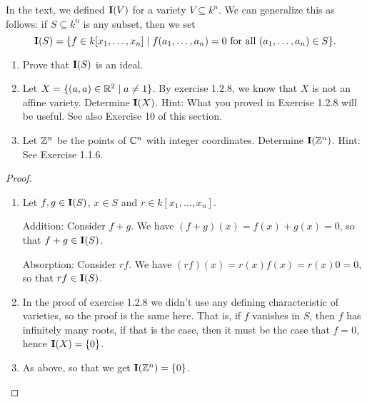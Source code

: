 \begin{exercise}{15}
In the text, we defined $\mathbf{I}(V)$ for a variety $V\subseteq k^n$. We can generalize this as follows: if $S\subseteq k^n$ is any subset, then we set
\[
\mathbf{I}(S)=\{f\in k[x_1,\dots,x_n]\mid f(a_1,\dots,a_n)=0\text{ for all }(a_1,\dots,a_n)\in S\}.
\]
\begin{enumerate}
    \item Prove that $\mathbf{I}(S)$ is an ideal.
    \item Let $X=\{(a,a)\in\mathbb{R}^2\mid a\neq 1\}$. By exercise 1.2.8, we know that $X$ is not an affine variety. Determine $\mathbf{I}(X)$. Hint: What you proved in Exercise 1.2.8 will be useful. See also Exercise 10 of this section.
    \item Let $\mathbb{Z}^n$ be the points of $\mathbb{C}^n$ with integer coordinates. Determine $\mathbf{I}(\mathbb{Z}^n)$. Hint: See Exercise 1.1.6.
\end{enumerate}
\end{exercise}
\begin{proof}
\begin{enumerate}
    \item Let $f,g\in\mathbf{I}(S)$, $x\in S$ and $r\in k[x_1,\dots,x_n]$. 

    Addition: Consider $f+g$. We have $(f+g)(x) =f(x)+g(x) =0$, so that $f+g\in\mathbf{I}(S)$.

    Absorption: Consider $rf$. We have $(rf)(x) =r(x)f(x) =r(x)0 =0$, so that $rf\in\mathbf{I}(S)$.
    \item In the proof of exercise 1.2.8 we didn't use any defining characteristic of varieties, so the proof is the same here. That is, if $f$ vanishes in $S$, then $f$ has infinitely many roots, if that is the case, then it must be the case that $f=0$, hence $\mathbf{I}(X)=\{0\}$.
    \item As above, so that we get $\mathbf{I}(\mathbb{Z}^n)=\{0\}$.
\end{enumerate}
\end{proof}

